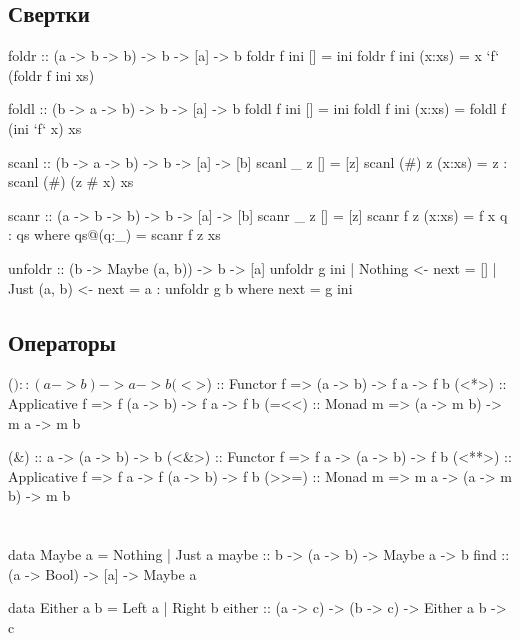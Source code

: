 \documentclass[11pt,a4paper]{article}
\begin{document}
\subsection{Свертки}
\begin{minipage}{0.47\textwidth}
\begin{hscode}
foldr :: (a -> b -> b) -> b -> [a] -> b
foldr f ini [] = ini
foldr f ini (x:xs) = x `f` (foldr f ini xs)

foldl :: (b -> a -> b) -> b -> [a] -> b
foldl f ini [] = ini
foldl f ini (x:xs) = foldl f (ini `f` x) xs

scanl :: (b -> a -> b) -> b -> [a] -> [b]
scanl _ z [] = [z]
scanl (#) z (x:xs) = z : scanl (#) (z # x) xs
\end{hscode}
\end{minipage}
\hfill
\begin{minipage}{0.47\textwidth}
\begin{hscode}
scanr :: (a -> b -> b) -> b -> [a] -> [b]
scanr _ z [] = [z]
scanr f z (x:xs) = f x q : qs
                     where qs@(q:_) = scanr f z xs

unfoldr :: (b -> Maybe (a, b)) -> b -> [a]
unfoldr g ini 
  | Nothing     <- next = []
  | Just (a, b) <- next = a : unfoldr g b
  where next = g ini
\end{hscode}
\end{minipage}




\subsection{Операторы}
\begin{hscode}
($)    ::                  (a -> b) -> a -> b
(<$>)  :: Functor f =>     (a -> b) -> f a -> f b
(<*>)  :: Applicative f => f (a -> b) -> f a -> f b
(=<<)  :: Monad m =>       (a -> m b) -> m a -> m b

(&)    ::                  a -> (a -> b) -> b
(<&>)  :: Functor f =>     f a -> (a -> b) -> f b
(<**>) :: Applicative f => f a -> f (a -> b) -> f b
(>>=)  :: Monad m =>       m a -> (a -> m b) -> m b
\end{hscode}


\section{}
\begin{minipage}{0.47\textwidth}
\begin{hscode}
data Maybe a = Nothing | Just a
maybe :: b -> (a -> b) -> Maybe a -> b
find :: (a -> Bool) -> [a] -> Maybe a
\end{hscode}
\end{minipage}
\hfill
\begin{minipage}{0.47\textwidth}
\begin{hscode}
data Either a b = Left a | Right b
either :: (a -> c) -> (b -> c) -> Either a b -> c
\end{hscode}
\end{minipage}
\end{document}
